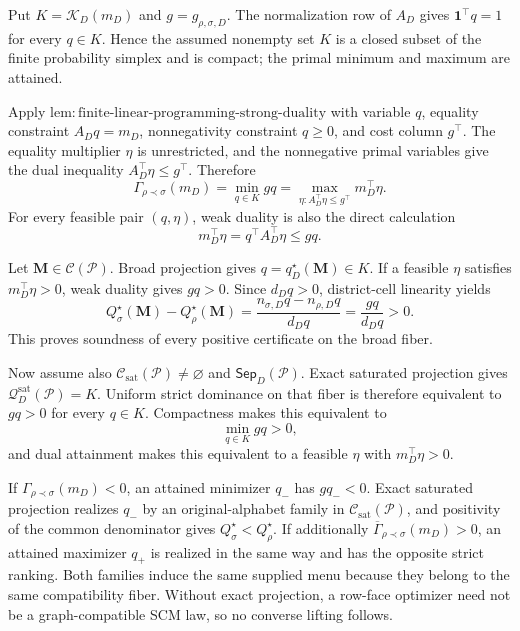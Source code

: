 Put \(K=\mathcal K_D(m_D)\) and \(g=g_{\rho,\sigma,D}\). The normalization row of \(A_D\) gives \(\mathbf 1^\top q=1\) for every \(q\in K\). Hence the assumed nonempty set \(K\) is a closed subset of the finite probability simplex and is compact; the primal minimum and maximum are attained.

Apply \(\mathrm{lem:finite\text{-}linear\text{-}programming\text{-}strong\text{-}duality}\) with variable \(q\), equality constraint \(A_Dq=m_D\), nonnegativity constraint \(q\geq0\), and cost column \(g^\top\). The equality multiplier \(\eta\) is unrestricted, and the nonnegative primal variables give the dual inequality \(A_D^\top\eta\leq g^\top\). Therefore
\[
\Gamma_{\rho\prec\sigma}(m_D)
=\min_{q\in K}gq
=\max_{\eta:A_D^\top\eta\leq g^\top}m_D^\top\eta.
\]
For every feasible pair \((q,\eta)\), weak duality is also the direct calculation
\[
m_D^\top\eta=q^\top A_D^\top\eta\leq gq.
\]

Let \(\mathbf M\in\mathcal C(\mathcal P)\). Broad projection gives \(q=q_D^\star(\mathbf M)\in K\). If a feasible \(\eta\) satisfies \(m_D^\top\eta>0\), weak duality gives \(gq>0\). Since \(d_Dq>0\), district-cell linearity yields
\[
Q_\sigma^\star(\mathbf M)-Q_\rho^\star(\mathbf M)
=\frac{n_{\sigma,D}q-n_{\rho,D}q}{d_Dq}
=\frac{gq}{d_Dq}>0.
\]
This proves soundness of every positive certificate on the broad fiber.

Now assume also \(\mathcal C_{\mathrm{sat}}(\mathcal P)\ne\varnothing\) and \(\mathsf{Sep}_D(\mathcal P)\). Exact saturated projection gives \(\mathcal Q_D^{\mathrm{sat}}(\mathcal P)=K\). Uniform strict dominance on that fiber is therefore equivalent to \(gq>0\) for every \(q\in K\). Compactness makes this equivalent to
\[
\min_{q\in K}gq>0,
\]
and dual attainment makes this equivalent to a feasible \(\eta\) with \(m_D^\top\eta>0\).

If \(\Gamma_{\rho\prec\sigma}(m_D)<0\), an attained minimizer \(q_-\) has \(gq_-<0\). Exact saturated projection realizes \(q_-\) by an original-alphabet family in \(\mathcal C_{\mathrm{sat}}(\mathcal P)\), and positivity of the common denominator gives \(Q_\sigma^\star<Q_\rho^\star\). If additionally \(\overline\Gamma_{\rho\prec\sigma}(m_D)>0\), an attained maximizer \(q_+\) is realized in the same way and has the opposite strict ranking. Both families induce the same supplied menu because they belong to the same compatibility fiber. Without exact projection, a row-face optimizer need not be a graph-compatible SCM law, so no converse lifting follows.